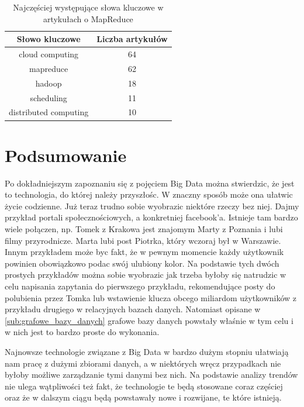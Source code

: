 \documentclass[10pt,twocolumn]{llncs}          %
\begin{document}
\begin{table}[t]
    \centering
    \caption{Najczęściej występujące słowa kluczowe w artykułach o MapReduce}
    \label{tabela_mapreduce}
    \begin{tabular}{|c|c|}
        \hline 
        Słowo kluczowe & Liczba artykułów\\
        \hline
        cloud computing & 64 \\
        \hline
        mapreduce & 62 \\
        \hline
        hadoop & 18 \\
        \hline
        scheduling & 11 \\
        \hline
        distributed computing & 10 \\
        \hline
    \end{tabular}
\end{table}



\newpage
\newpage
\newpage

\section{Podsumowanie}
\label{sec:podsumowanie}
Po dokładniejszym zapoznaniu się z pojęciem Big Data można stwierdzic, że jest to technologia, do której należy przyszłośc. W znaczny sposób może ona ułatwic życie codzienne. Już teraz trudno sobie wyobrazic niektóre rzeczy bez niej. Dajmy przykład portali społecznościowych, a konkretniej facebook'a. Istnieje tam bardzo wiele połączen, np. Tomek z Krakowa jest znajomym Marty z Poznania i lubi filmy przyrodnicze. Marta lubi post Piotrka, który wczoraj był w Warszawie. Innym przykładem może byc fakt, że w pewnym momencie każdy użytkownik powinien obowiązkowo podac swój ulubiony kolor. Na podstawie tych dwóch prostych przykładów można sobie wyobrazic jak trzeba byłoby się natrudzic w celu napisania zapytania do pierwszego przykładu, rekomendujące posty do polubienia przez Tomka lub wstawienie klucza obcego miliardom użytkowników z przykładu drugiego w relacyjnych bazach danych. Natomiast opisane w \ref{sub:grafowe_bazy_danych} grafowe bazy danych powstały właśnie w tym celu i w nich jest to bardzo proste do wykonania.

Najnowsze technologie związane z Big Data w bardzo dużym stopniu ułatwiają nam pracę z dużymi zbiorami danych, a w niektórych wręcz przypadkach nie byłoby możliwe zarządzanie tymi danymi bez nich. Na podstawie analizy trendów nie ulega wątpliwości też fakt, że technologie te będą stosowane coraz częściej oraz że w dalszym ciągu będą powstawały nowe i rozwijane, te które istnieją. 

\nocite{*}


\end{document}
